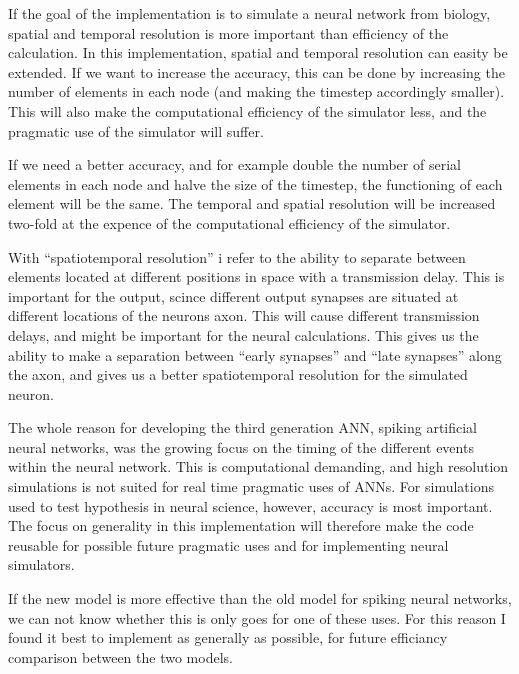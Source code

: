 \documentclass[b5paper,11 pt]{report}
\begin{document}
If the goal of the implementation is to simulate a neural network from biology, spatial and temporal resolution is more important than efficiency of the calculation.
In this implementation, spatial and temporal resolution can easity be extended.
If we want to increase the accuracy, this can be done by increasing the number of elements in each node (and making the timestep accordingly smaller).
This will also make the computational efficiency of the simulator less, and the pragmatic use of the simulator will suffer.

If we need a better accuracy, and for example double the number of serial elements in each node and halve the size of the timestep, the functioning of each element will be the same.
The temporal and spatial resolution will be increased two-fold at the expence of the computational efficiency of the simulator.

With ``spatiotemporal resolution'' i refer to the ability to separate between elements located at different positions in space with a transmission delay.
This is important for the output, scince different output synapses are situated at different locations of the neurons axon.
This will cause different transmission delays, and might be important for the neural calculations.
This gives us the ability to make a separation between ``early synapses'' and ``late synapses'' along the axon, and gives us a better spatiotemporal resolution for the simulated neuron.

The whole reason for developing the third generation ANN, spiking artificial neural networks, was the growing focus on the timing of the different events within the neural network.
This is computational demanding, and high resolution simulations is not suited for real time pragmatic uses of ANNs. For simulations used to test hypothesis in neural science, however, accuracy is most important.
The focus on generality in this implementation will therefore make the code reusable for possible future pragmatic uses and for implementing neural simulators.

If the new model is more effective than the old model for spiking neural networks, we can not know whether this is only goes for one of these uses. 
For this reason I found it best to implement as generally as possible, for future efficiancy comparison between the two models.
 
\end{document}
